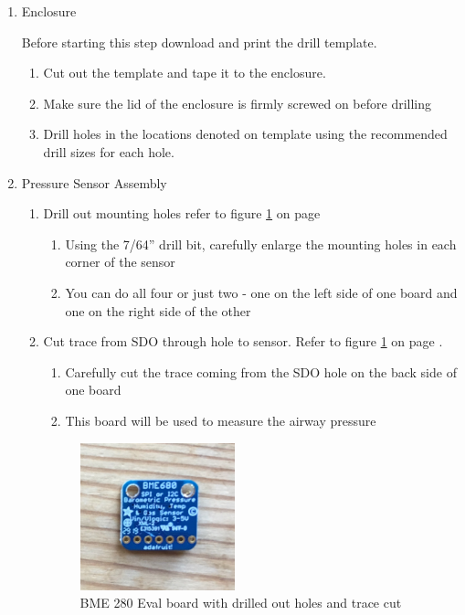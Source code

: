\documentclass[11pt, letterpaper]{article}
\begin{document}
\begin{enumerate}
\item \label{itm:enclosure}
Enclosure

Before starting this step download and print the drill template.

\begin{enumerate}[label=2.\arabic*]
\item
Cut out the template and tape it to the enclosure.
\item
Make sure the lid of the enclosure is firmly screwed on before drilling
\item
Drill holes in the locations denoted on template using the recommended drill sizes for each hole.
\end{enumerate}

\item
Pressure Sensor Assembly
\begin{enumerate}[label=3.\arabic*]
\item
Drill out mounting holes refer to figure \ref{fig:bme_1} on page \pageref{fig:bme_1}
\begin{enumerate}[label=3.1.\arabic*]
\item
Using the 7/64'' drill bit, carefully enlarge the mounting holes in each corner of the sensor
\item
You can do all four or just two - one on the left side of one board and one on the right side of the other
\end{enumerate}
\item
Cut trace from SDO through hole to sensor. Refer to figure \ref{fig:bme_1} on page \pageref{fig:bme_1}.
\begin{enumerate}[label=3.2.\arabic*]
\item
Carefully cut the trace coming from the SDO hole on the back side of one board
\item
This board will be used to measure the airway pressure
\end{enumerate}
\begin{figure}[H]
\label{fig:bme_1}
\centering
\includegraphics[width=0.45\textwidth]{images/bme_1.JPG}
\caption{BME 280 Eval board with drilled out holes and trace cut}
\end{figure}


\end{enumerate}
\end{enumerate}
\end{document}
